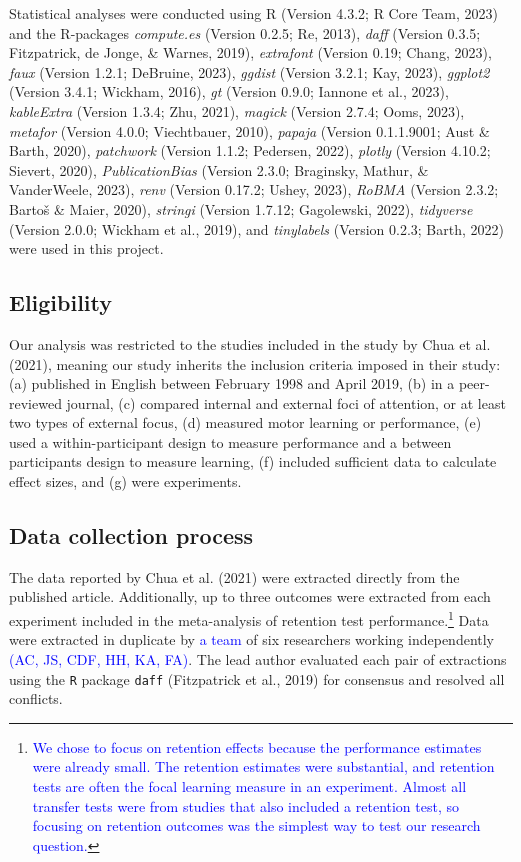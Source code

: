 \documentclass[
  man, donotrepeattitle,floatsintext]{apa7}
\begin{document}
Statistical analyses were conducted using R (Version 4.3.2; R Core Team, 2023) and the R-packages \emph{compute.es} (Version 0.2.5; Re, 2013), \emph{daff} (Version 0.3.5; Fitzpatrick, de Jonge, \& Warnes, 2019), \emph{extrafont} (Version 0.19; Chang, 2023), \emph{faux} (Version 1.2.1; DeBruine, 2023), \emph{ggdist} (Version 3.2.1; Kay, 2023), \emph{ggplot2} (Version 3.4.1; Wickham, 2016), \emph{gt} (Version 0.9.0; Iannone et al., 2023), \emph{kableExtra} (Version 1.3.4; Zhu, 2021), \emph{magick} (Version 2.7.4; Ooms, 2023), \emph{metafor} (Version 4.0.0; Viechtbauer, 2010), \emph{papaja} (Version 0.1.1.9001; Aust \& Barth, 2020), \emph{patchwork} (Version 1.1.2; Pedersen, 2022), \emph{plotly} (Version 4.10.2; Sievert, 2020), \emph{PublicationBias} (Version 2.3.0; Braginsky, Mathur, \& VanderWeele, 2023), \emph{renv} (Version 0.17.2; Ushey, 2023), \emph{RoBMA} (Version 2.3.2; Bartoš \& Maier, 2020), \emph{stringi} (Version 1.7.12; Gagolewski, 2022), \emph{tidyverse} (Version 2.0.0; Wickham et al., 2019), and \emph{tinylabels} (Version 0.2.3; Barth, 2022) were used in this project.

\hypertarget{eligibility}{%
\subsection{Eligibility}\label{eligibility}}

Our analysis was restricted to the studies included in the study by Chua et al. (2021), meaning our study inherits the inclusion criteria imposed in their study: (a) published in English between February 1998 and April 2019, (b) in a peer-reviewed journal, (c) compared internal and external foci of attention, or at least two types of external focus, (d) measured motor learning or performance, (e) used a within-participant design to measure performance and a between participants design to measure learning, (f) included sufficient data to calculate effect sizes, and (g) were experiments.

\hypertarget{data-collection-process}{%
\subsection{Data collection process}\label{data-collection-process}}

The data reported by Chua et al. (2021) were extracted directly from the published article. Additionally, up to three outcomes were extracted from each experiment included in the meta-analysis of retention test performance.\footnote{\textcolor{blue}{We chose to focus on retention effects because the performance estimates were already small. The retention estimates were substantial, and retention tests are often the focal learning measure in an experiment. Almost all transfer tests were from studies that also included a retention test, so focusing on retention outcomes was the simplest way to test our research question.}} Data were extracted in duplicate by \textcolor{blue}{a team} of six researchers working independently \textcolor{blue}{(AC, JS, CDF, HH, KA, FA)}. The lead author evaluated each pair of extractions using the \texttt{R} package \texttt{daff} (Fitzpatrick et al., 2019) for consensus and resolved all conflicts.
\end{document}
